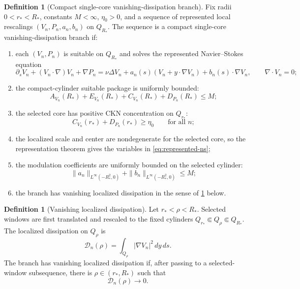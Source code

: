 \documentclass[11pt]{amsart}
\theoremstyle{plain}
\theoremstyle{definition}
\newtheorem{definition}[theorem]{Definition}
\theoremstyle{remark}
\begin{document}
\begin{definition}[Compact single-core vanishing-dissipation branch]\label{def:single-core-branch}
Fix radii \(0<r_*<R_*\), constants \(M<\infty\), \(\eta_0>0\), and a sequence
of represented local rescalings \((V_n,P_n,a_n,b_n)\) on \(Q_{R_*}\).  The
sequence is a compact single-core vanishing-dissipation branch if:
\begin{enumerate}[label=\textup{(\roman*)}]
\item each \((V_n,P_n)\) is suitable on \(Q_{R_*}\) and solves the represented
      Navier--Stokes equation
      \begin{equation}\label{eq:represented-ns}
      \partial_s V_n+(V_n\cdot\nabla)V_n+\nabla P_n
      =\nu\Delta V_n+a_n(s)(V_n+y\cdot\nabla V_n)+b_n(s)\cdot\nabla V_n,
      \qquad \nabla\cdot V_n=0;
      \end{equation}
\item the compact-cylinder suitable package is uniformly bounded:
      \[
      A_{V_n}(R_*)+E_{V_n}(R_*)+C_{V_n}(R_*)+D_{P_n}(R_*)\le M;
      \]
\item the selected core has positive CKN concentration on \(Q_{r_*}\):
      \[
      C_{V_n}(r_*)+D_{P_n}(r_*)\ge\eta_0
      \qquad\text{for all }n;
      \]
\item the localized scale and center are nondegenerate for the selected core,
      so the representation theorem gives the variables in
      \eqref{eq:represented-ns};
\item the modulation coefficients are uniformly bounded on the selected cylinder:
      \[
      \|a_n\|_{L^\infty(-R_*^2,0)}+\|b_n\|_{L^\infty(-R_*^2,0)}\le M;
      \]
\item the branch has vanishing localized dissipation in the sense of
      \cref{def:localized-dissipation} below.
\end{enumerate}
\end{definition}

\begin{definition}[Vanishing localized dissipation]\label{def:localized-dissipation}
Let \(r_*<\rho<R_*\).  Selected windows are first translated and rescaled to the
fixed cylinders \(Q_{r_*}\Subset Q_\rho\Subset Q_{R_*}\).  The localized
dissipation on \(Q_\rho\) is
\[
  \mathcal D_n(\rho)=\int_{Q_\rho}|\nabla V_n|^2\,dy\,ds.
\]
The branch has vanishing localized dissipation if, after passing to a
selected-window subsequence, there is \(\rho\in(r_*,R_*)\) such that
\[
  \mathcal D_n(\rho)\to0.
\]
\end{definition}
\end{document}
